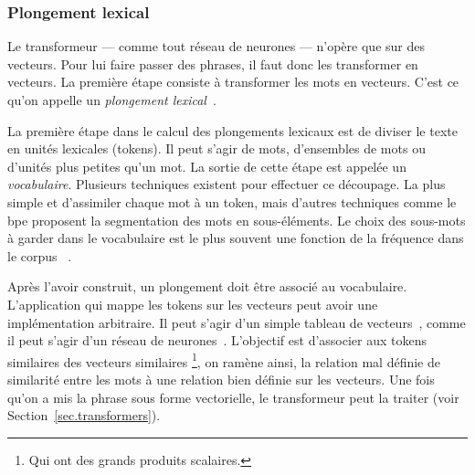 \subsubsection{Plongement lexical}

Le transformeur --- comme tout réseau de neurones --- n'opère que sur des vecteurs.
Pour lui faire passer des phrases, il faut donc les transformer en vecteurs.
La première étape consiste à transformer les mots en vecteurs.
C'est ce qu'on appelle un \emph{plongement lexical}~\cite{Almeida_Xexéo_2019}.

La première étape dans le calcul des plongements lexicaux est de diviser le texte en unités lexicales (tokens).
Il peut s'agir de mots, d'ensembles de mots ou d'unités plus petites qu'un mot.
La sortie de cette étape est appelée un \emph{vocabulaire}.
Plusieurs techniques existent pour effectuer ce découpage. 
La plus simple et d'assimiler chaque mot à un token,
mais d'autres techniques comme le \gls{bpe} proposent la segmentation des mots en sous-éléments.
Le choix des sous-mots à garder dans le vocabulaire est le plus souvent une fonction de la fréquence dans le corpus%
~\cite{Rai_Borah_2021}.


Après l'avoir construit, un plongement doit être associé au vocabulaire.
L'application qui mappe les tokens sur les vecteurs peut avoir une implémentation arbitraire.
Il peut s'agir d'un simple tableau de vecteurs~\cite{Paszke_et_al_2019},
comme il peut s'agir d'un réseau de neurones~\cite{Church_2017}.
L'objectif est d'associer aux tokens similaires des vecteurs similaires%
\footnote{Qui ont des grands produits scalaires.}, %
on ramène ainsi, la relation mal définie de similarité entre les mots à une relation bien définie sur les vecteurs.
Une fois qu'on a mis la phrase sous forme vectorielle,
le transformeur peut la traiter (voir Section~\ref{sec.transformers}).